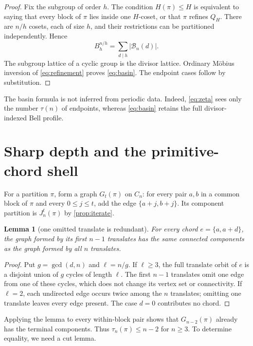 \documentclass[11pt,a4paper]{amsart}
\newtheorem{lemma}[theorem]{Lemma}
\theoremstyle{definition}
\theoremstyle{remark}
\newcommand{\Cn}{C_n}
\newcommand{\card}[1]{\lvert #1\rvert}
\begin{document}
\begin{proof}
Fix the subgroup of order $h$.  The condition $H(\pi)\leq H$ is equivalent
to saying that every block of $\pi$ lies inside one $H$-coset, or that
$\pi$ refines $Q_H$.  There are $n/h$ cosets, each of size $h$, and their
restrictions can be partitioned independently.  Hence
\begin{equation}\label{eq:refinement}
       B_h^{n/h}=\sum_{d\mid h}\card{\mathcal B_n(d)}.
\end{equation}
The subgroup lattice of a cyclic group is the divisor lattice.  Ordinary
M\"obius inversion of \eqref{eq:refinement} proves \eqref{eq:basin}.  The
endpoint cases follow by substitution.
\end{proof}

The basin formula is not inferred from periodic data.  Indeed,
\eqref{eq:zeta} sees only the number $\tau(n)$ of endpoints, whereas
\eqref{eq:basin} retains the full divisor-indexed Bell profile.

\section{Sharp depth and the primitive-chord shell}\label{sec:depth}

For a partition $\pi$, form a graph $G_t(\pi)$ on $\Cn$: for every pair
$a,b$ in a common block of $\pi$ and every $0\leq j\leq t$, add the edge
$\{a+j,b+j\}$.  Its component partition is $J_n^t(\pi)$ by
\cref{prop:iterate}.

\begin{lemma}[one omitted translate is redundant]\label{lem:one-missing}
For every chord $e=\{a,a+d\}$, the graph formed by its first $n-1$
translates has the same connected components as the graph formed by all
$n$ translates.
\end{lemma}

\begin{proof}
Put $g=\gcd(d,n)$ and $\ell=n/g$.  If $\ell\geq3$, the full translate
orbit of $e$ is a disjoint union of $g$ cycles of length $\ell$.  The first
$n-1$ translates omit one edge from one of these cycles, which does not
change its vertex set or connectivity.  If $\ell=2$, each undirected edge
occurs twice among the $n$ translates; omitting one translate leaves every
edge present.  The case $d=0$ contributes no chord.
\end{proof}

Applying the lemma to every within-block pair shows that $G_{n-2}(\pi)$
already has the terminal components.  Thus $\tau_n(\pi)\leq n-2$ for
$n\geq3$.  To determine equality, we need a cut lemma.
\end{document}
